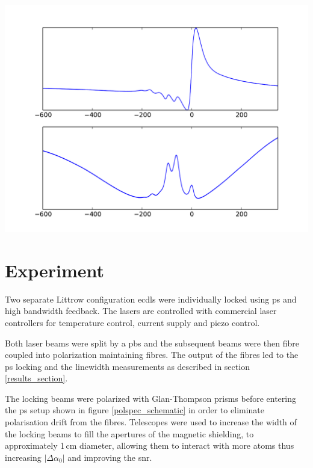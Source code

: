 \documentclass{article}
\newenvironment{Figure}
  {\par\medskip\noindent\minipage{\linewidth}}
  {\endminipage\par\medskip}
\begin{document}
\begin{multicols}{2}
\begin{Figure}
    \centering
    \captionsetup{type=figure}
    \includegraphics[width=\linewidth]{Figs/spectra.pdf}
    \label{polspec_spectrum}
\end{Figure}

\section{Experiment}

Two separate Littrow configuration \glspl*{ecdl} were individually locked using \gls*{ps} and high bandwidth feedback. The lasers are controlled with commercial laser controllers\cite{mogbox} for temperature control, current supply and piezo control. 

Both laser beams were split by a \gls*{pbs} and the subsequent beams were then fibre coupled into polarization maintaining fibres. The output of the fibres led to the \gls*{ps} locking and the linewidth measurements as described in section \ref{results_section}.

The locking beams were polarized with Glan-Thompson prisms before entering the \gls*{ps} setup shown in figure \ref{polspec_schematic} in order to eliminate polarisation drift from the fibres. Telescopes were used to increase the width of the locking beams to fill the apertures of the magnetic shielding, to approximately 1\,cm diameter, allowing them to interact with more atoms thus increasing $|\Delta\alpha_0|$\cite{demtroder_laser_2003} and improving the \gls*{snr}.


\end{multicols}
\end{document}
